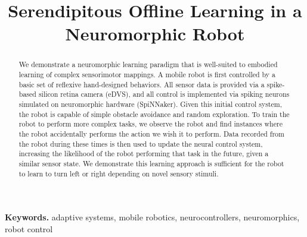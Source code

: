 \documentclass[conference]{IEEEtran}
\begin{document}
%
\title{Serendipitous Offline Learning in a Neuromorphic Robot}



% 
\author{
}


\maketitle


\begin{abstract}
We demonstrate a neuromorphic learning paradigm that is well-suited to embodied learning of complex sensorimotor mappings. A mobile robot is first controlled by a basic set of reflexive hand-designed behaviors. All sensor data is provided via a spike-based silicon retina camera (eDVS), and all control is implemented via spiking neurons simulated on neuromorphic hardware (SpiNNaker). Given this initial control system, the robot is capable of simple obstacle avoidance and random exploration. To train the robot to perform more complex tasks, we observe the robot and find instances where the robot accidentally performs the action we wish it to perform. Data recorded from the robot during these times is then used to update the neural control system, increasing the likelihood of the robot performing that task in the future, given a similar sensor state. We demonstrate this learning approach is sufficient for the robot to learn to turn left or right depending on novel sensory stimuli.

\end{abstract}
\medskip
\noindent \textbf{Keywords.} adaptive systems, mobile robotics, neurocontrollers, neuromorphics, robot control
\end{document}
